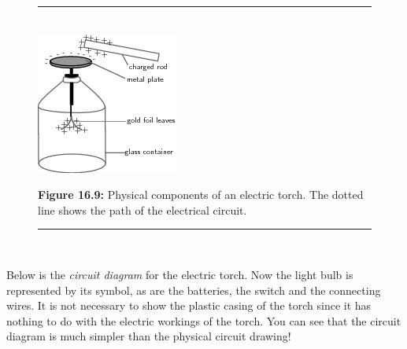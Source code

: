 	\begin{figure}[H] %
    \begin{center}
    \rule[.1in]{\figurerulewidth}{.005in} \\
        \label{m38771*uid14!!!underscore!!!media}\label{m38771*uid14!!!underscore!!!printimage}\includegraphics{col11305.imgs/m38771_PG10C9_009.png} %
        
      \vspace{2pt}
    \vspace{\rubberspace}\par \begin{cnxcaption}
	  \small \textbf{Figure 16.9: }Physical components of an electric torch. The dotted line shows the path of the electrical circuit.
	\end{cnxcaption}
      
    \vspace{.1in}
    \rule[.1in]{\figurerulewidth}{.005in} \\
        
    \end{center}

 \end{figure}   

    \addtocounter{footnote}{-0}
    
          \label{m38771*id63252}Below is the \textsl{circuit diagram} for the electric torch. Now the light bulb is represented by its symbol, as are the batteries, the switch and the connecting wires. It is not necessary to show the plastic casing of the torch since it has nothing to do with the electric workings of the torch. You can see that the circuit diagram is much simpler than the physical circuit drawing!\par 
          
    \setcounter{subfigure}{0}


